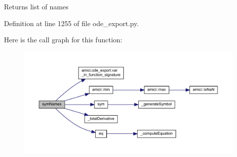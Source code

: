 \begin{DoxyReturn}{Returns}
list of names 
\end{DoxyReturn}


Definition at line 1255 of file ode\+\_\+export.\+py.

Here is the call graph for this function\+:
\nopagebreak
\begin{figure}[H]
\begin{center}
\leavevmode
\includegraphics[width=350pt]{classamici_1_1ode__export_1_1_o_d_e_model_a2223bbe62f3234b8f40c5a566064a481_cgraph}
\end{center}
\end{figure}
